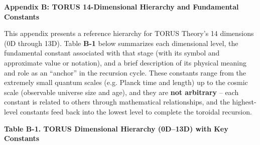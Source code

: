 \documentclass[]{article}
\begin{document}
\textbf{Appendix B: TORUS 14-Dimensional Hierarchy and Fundamental
Constants}

This appendix presents a reference hierarchy for TORUS Theory's 14
dimensions (0D through 13D). Table \textbf{B-1} below summarizes each
dimensional level, the fundamental constant associated with that stage
(with its symbol and approximate value or notation), and a brief
description of its physical meaning and role as an ``anchor'' in the
recursion cycle. These constants range from the extremely small quantum
scales (e.g. Planck time and length) up to the cosmic scale (observable
universe size and age), and they are \textbf{not arbitrary} -- each
constant is related to others through mathematical relationships, and
the highest-level constants feed back into the lowest level to complete
the toroidal recursion​.

\textbf{Table B-1. TORUS Dimensional Hierarchy (0D--13D) with Key
Constants}​
\end{document}
